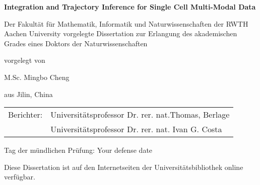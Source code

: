 \begin{titlepage}
\large
\begin{center}

\begin{doublespacing} 

\vspace*{1cm}

{\Large{\textbf{Integration and Trajectory Inference for Single Cell Multi-Modal Data}}}


\vspace{2cm}

\begin{minipage}[b]{14cm}
\centering
Der Fakultät für Mathematik, Informatik und Naturwissenschaften der RWTH
Aachen University vorgelegte Dissertation zur Erlangung des akademischen
Grades eines Doktors der Naturwissenschaften
\end{minipage}

\vspace{2cm}

vorgelegt von

M.Sc. Mingbo Cheng


aus Jilin, China

\end{doublespacing} 
\end{center}

\pagestyle{empty}


\vspace{5cm}
\noindent
\begin{tabular}{@{}ll}
Berichter:
	& Universitätsprofessor Dr. rer. nat.Thomas, Berlage \\
	& Universitätsprofessor Dr. rer. nat. Ivan G. Costa
\end{tabular}

\vspace*{\fill}
\noindent
Tag der m\"undlichen Pr\"ufung: Your defense date

\noindent
Diese Dissertation ist auf den Internetseiten der Universitätsbibliothek online verf\"ugbar.
\cleardoublepage
\end{titlepage}


